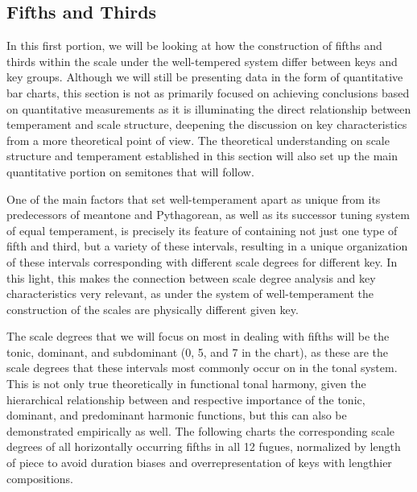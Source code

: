     \subsection{Fifths and Thirds}\label{fifths-and-thirds}

    In this first portion, we will be looking at how the construction of
fifths and thirds within the scale under the well-tempered system differ
between keys and key groups. Although we will still be presenting data
in the form of quantitative bar charts, this section is not as primarily
focused on achieving conclusions based on quantitative measurements as
it is illuminating the direct relationship between temperament and scale
structure, deepening the discussion on key characteristics from a more
theoretical point of view. The theoretical understanding on scale
structure and temperament established in this section will also set up
the main quantitative portion on semitones that will follow.

One of the main factors that set well-temperament apart as unique from
its predecessors of meantone and Pythagorean, as well as its successor
tuning system of equal temperament, is precisely its feature of
containing not just one type of fifth and third, but a variety of these
intervals, resulting in a unique organization of these intervals
corresponding with different scale degrees for different key. In this
light, this makes the connection between scale degree analysis and key
characteristics very relevant, as under the system of well-temperament
the construction of the scales are physically different given key.

The scale degrees that we will focus on most in dealing with fifths will
be the tonic, dominant, and subdominant (0, 5, and 7 in the chart), as
these are the scale degrees that these intervals most commonly occur on
in the tonal system. This is not only true theoretically in functional
tonal harmony, given the hierarchical relationship between and
respective importance of the tonic, dominant, and predominant harmonic
functions, but this can also be demonstrated empirically as well. The
following charts the corresponding scale degrees of all horizontally
occurring fifths in all 12 fugues, normalized by length of piece to
avoid duration biases and overrepresentation of keys with lengthier
compositions.




